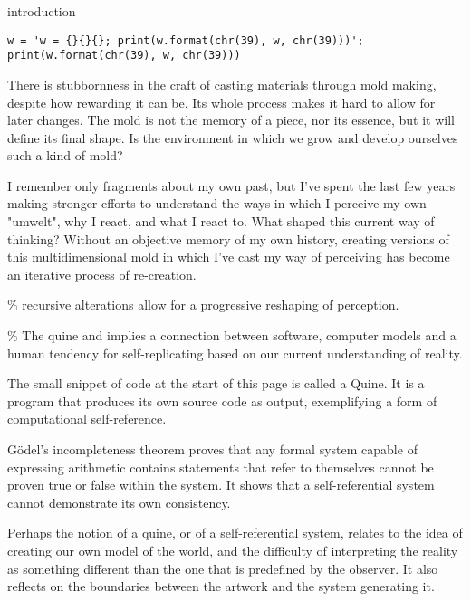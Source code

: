 \begin{center}
\Huge introduction
\vspace{2cm}
\begin{flushright}
\footnotesize 
\begin{verbatim}
w = 'w = {}{}{}; print(w.format(chr(39), w, chr(39)))'; 
print(w.format(chr(39), w, chr(39)))
\end{verbatim} 
\end{flushright}
\vspace{2cm}
\end{center}
\normalsize

There is stubbornness in the craft of casting materials through mold making, despite how rewarding it can be. Its whole process makes it hard to allow for later changes. The mold is not the memory of a piece, nor its essence, but it will define its final shape. Is the environment in which we grow and develop ourselves such a kind of mold? 

I remember only fragments about my own past, but I’ve spent the last few years making stronger efforts to understand the ways in which I perceive my own "umwelt", why I react, and what I react to.  What shaped this current way of thinking? Without an objective memory of my own history, creating versions of this multidimensional mold in which I’ve cast my way of perceiving has become an iterative process of re-creation.


{\scriptsize \textcolor{comment}{\% recursive alterations allow for a progressive reshaping of perception. }}

{\scriptsize \textcolor{comment}{\% The quine and implies a connection between software, computer models and a human tendency for self-replicating based on our current understanding of reality.}}

The small snippet of code at the start of this page is called a Quine. It is a program that produces its own source code as output, exemplifying a form of computational self-reference. 

Gödel’s incompleteness theorem proves that any formal system capable of expressing arithmetic contains statements that refer to themselves cannot be proven true or false within the system. It shows that a self-referential system cannot demonstrate its own consistency.

Perhaps the notion of a quine, or of a self-referential system, relates to the idea of creating our own model of the world, and the difficulty of interpreting the reality as something different than the one that is predefined by the observer. It also reflects on the boundaries between the artwork and the system generating it.

